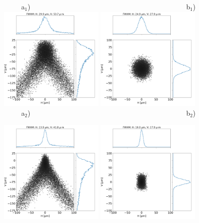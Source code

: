 \documentclass{iucr}              %
\begin{document}
\begin{figure}\label{fig:als}
\flushleft
~~~~~a$_1$)~~~~~~~~~~~~~~~~~~~~~~~~~~~~~~~~~~~~~~~~~~~~~b$_1$) \\
\centering
\includegraphics[width=0.45\textwidth]{figures/als_toroid.png}
\includegraphics[width=0.45\textwidth]{figures/als_diaboloid.png} \\

\flushleft
~~~~~a$_2$)~~~~~~~~~~~~~~~~~~~~~~~~~~~~~~~~~~~~~~~~~~~~~b$_2$) \\
\centering

\includegraphics[width=0.45\textwidth]{figures/alsu_toroid.png}
\includegraphics[width=0.45\textwidth]{figures/alsu_diaboloid.png} \\


\end{figure}
\end{document}
